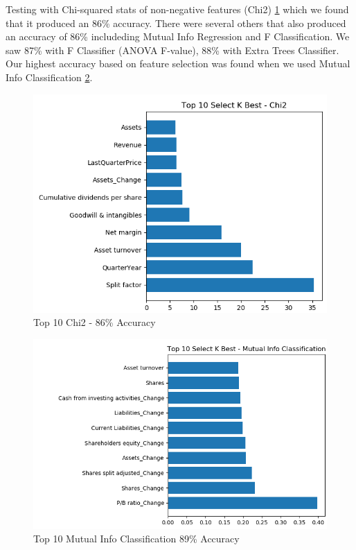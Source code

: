\documentclass[conference]{IEEEtran}
\begin{document}
Testing with Chi-squared stats of non-negative features (Chi2) \ref{chi2} which we found that it produced an 86\% accuracy.  There were several others that also produced an accuracy of 86\% includeding Mutual Info Regression and F Classification. We saw 87\% with F Classifier (ANOVA F-value), 88\% with Extra Trees Classifier. Our highest accuracy based on feature selection was found when we used Mutual Info Classification \ref{mi}.

\begin{figure}
  \includegraphics[width=\linewidth]{Top10Chi2.png}
  \caption{Top 10 Chi2 - 86\% Accuracy}
  \label{chi2}
\end{figure}


\begin{figure}
  \includegraphics[width=\linewidth]{Top10MutualInfoClassification.png}
  \caption{Top 10 Mutual Info Classification 89\% Accuracy}
  \label{mi}
\end{figure}
\end{document}
